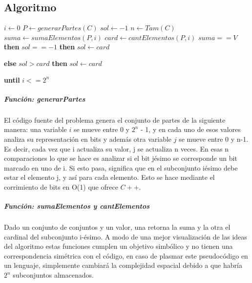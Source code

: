 \documentclass[8pt,a4paper]{article}
\begin{document}
\subsection{Algoritmo}

\renewcommand{\Then}{%
  \textbf{then}\stepcounter{indent} }
\renewcommand{\Else}{%
  \kill\addtocounter{indent}{-1}%
  \liprint\textbf{else}\>\>\stepcounter{indent}}
\renewcommand{\Until}{%
  \addtocounter{indent}{-1}%
  \kill\liprint\textbf{until} }

\begin{codebox}
  \li $i \gets 0$
  \li $P \gets generarPartes(C)$
  \li $sol \gets -1$
  \li $n \gets Tam(C)$
  \li \Repeat
  \li   $suma \gets sumaElementos(P, i)$
  \li   $card \gets cantElementos(P, i)$
  \li   \If $suma == V$ \Then
  \li 	\If $sol == -1$ \Then
  \li     $sol \gets card$
  \li 	\Else 
  \li 	\If $sol > card$ \Then
  \li 	$sol \gets card$
  		\End
        \End
        \End
  \li \Until $i <= 2^{n}$
\end{codebox}


\subparagraph{Función: generarPartes} El código fuente del problema genera el conjunto de partes de la siguiente manera: una variable $i$ se mueve entre 0 y $2^{n}$ - 1, y en cada uno de esos valores analiza su representación en bits y además otra variable $j$ se mueve entre 0 y n-1. Es decir, cada vez que i actualiza su valor, j se actualiza n veces. En esas n comparaciones lo que se hace es analizar si el bit jésimo se corresponde un bit marcado en uno de i. Si esto pasa, significa que en el subconjunto iésimo debe estar el elemento j, y así para cada elemento. Esto se hace mediante el corrimiento de bits en O(1) que ofrece $C++$.
\subparagraph{Función: sumaElementos y cantElementos} Dado un conjunto de conjuntos y un valor,  una retorna la suma y la otra el cardinal del subconjunto i-ésimo. A modo de una mejor visualización de las ideas del algoritmo estas funciones cumplen un objetivo simbólico y no tienen una correspondencia simétrica con el código, en caso de plasmar este pseudocódigo en un lenguaje, simplemente cambiará la complejidad espacial debido a que habría $2^{n}$ subconjuntos almacenados.
\end{document}
